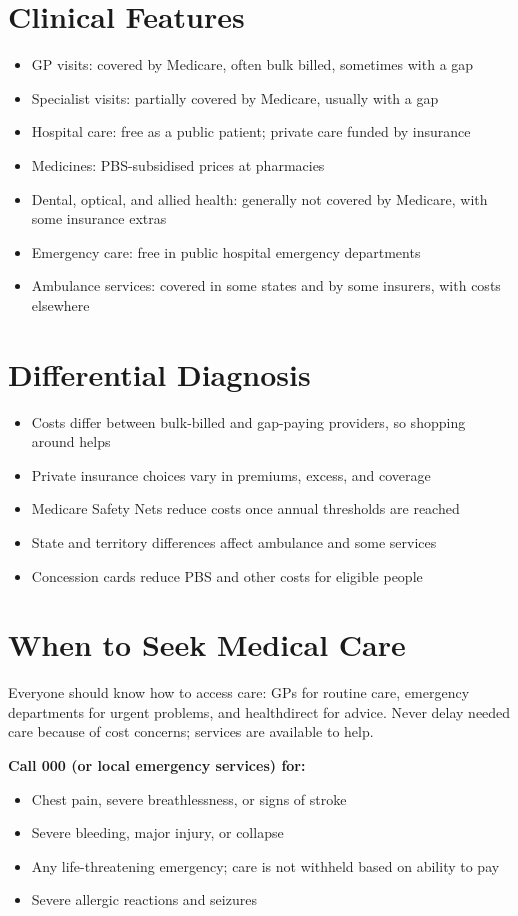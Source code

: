 \section*{Clinical Features}
\begin{itemize}
    \item GP visits: covered by Medicare, often bulk billed, sometimes with a gap
    \item Specialist visits: partially covered by Medicare, usually with a gap
    \item Hospital care: free as a public patient; private care funded by insurance
    \item Medicines: PBS-subsidised prices at pharmacies
    \item Dental, optical, and allied health: generally not covered by Medicare, with some insurance extras
    \item Emergency care: free in public hospital emergency departments
    \item Ambulance services: covered in some states and by some insurers, with costs elsewhere
\end{itemize}

\section*{Differential Diagnosis}
\begin{itemize}
    \item Costs differ between bulk-billed and gap-paying providers, so shopping around helps
    \item Private insurance choices vary in premiums, excess, and coverage
    \item Medicare Safety Nets reduce costs once annual thresholds are reached
    \item State and territory differences affect ambulance and some services
    \item Concession cards reduce PBS and other costs for eligible people
\end{itemize}

\section*{When to Seek Medical Care}
Everyone should know how to access care: GPs for routine care, emergency departments for urgent problems, and healthdirect for advice. Never delay needed care because of cost concerns; services are available to help.

\textbf{Call 000 (or local emergency services) for:}
\begin{itemize}
    \item Chest pain, severe breathlessness, or signs of stroke
    \item Severe bleeding, major injury, or collapse
    \item Any life-threatening emergency; care is not withheld based on ability to pay
    \item Severe allergic reactions and seizures
\end{itemize}

